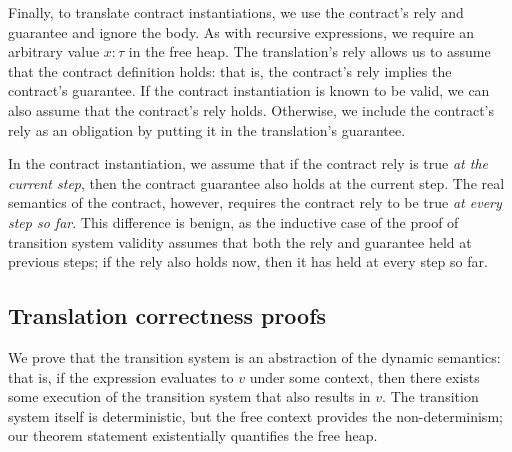 \documentclass[a4paper,UKenglish,cleveref, autoref, thm-restate,anonymous]{lipics-v2021}
\begin{document}
Finally, to translate contract instantiations, we use the contract's rely and guarantee and ignore the body.
As with recursive expressions, we require an arbitrary value $x: \tau$ in the free heap.
The translation's rely allows us to assume that the contract definition holds: that is, the contract's rely implies the contract's guarantee.
If the contract instantiation is known to be valid, we can also assume that the contract's rely holds.
Otherwise, we include the contract's rely as an obligation by putting it in the translation's guarantee.

In the contract instantiation, we assume that if the contract rely is true \emph{at the current step}, then the contract guarantee also holds at the current step.
The real semantics of the contract, however, requires the contract rely to be true \emph{at every step so far}.
This difference is benign, as the inductive case of the proof of transition system validity assumes that both the rely and guarantee held at previous steps; if the rely also holds now, then it has held at every step so far.


\subsection{Translation correctness proofs}
\label{s:transition:proof}

We prove that the transition system is an abstraction of the dynamic semantics: that is, if the expression evaluates to $v$ under some context, then there exists some execution of the transition system that also results in $v$.
The transition system itself is deterministic, but the free context provides the non-determinism; our theorem  statement existentially quantifies the free heap.
\end{document}
